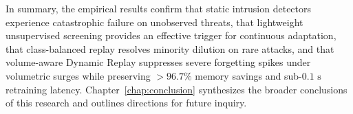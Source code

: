 In summary, the empirical results confirm that static intrusion detectors experience catastrophic failure on unobserved threats, that lightweight unsupervised screening provides an effective trigger for continuous adaptation, that class-balanced replay resolves minority dilution on rare attacks, and that volume-aware Dynamic Replay suppresses severe forgetting spikes under volumetric surges while preserving $>96.7\%$ memory savings and sub-$0.1\text{ s}$ retraining latency. Chapter~\ref{chap:conclusion} synthesizes the broader conclusions of this research and outlines directions for future inquiry.
